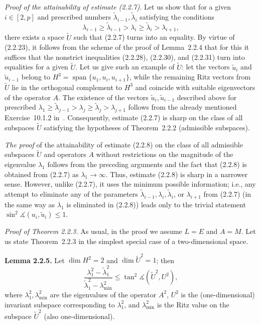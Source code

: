 \documentclass[11pt,oneside]{book}
\newcommand{\myspan}{\operatorname{span}}
\newcommand{\ang}{\measuredangle}
\begin{document}
\textit{Proof of the attainability of estimate (2.2.7).} Let us show that for a given $i \in [2, p]$ and prescribed numbers $\tilde{\lambda}_{i-1}, \tilde{\lambda}_i$ satisfying the conditions
\[
\lambda_{i-1} \geqslant \tilde{\lambda}_{i-1} > \lambda_i \geqslant \tilde{\lambda}_i > \lambda_{i+1},
\]
there exists a space $\widetilde{U}$ such that (2.2.7) turns into an equality. By virtue of (2.2.23), it follows from the scheme of the proof of Lemma~2.2.4 that for this it suffices that the nonstrict inequalities (2.2.28), (2.2.30), and (2.2.31) turn into equalities for a given $\widetilde{U}$. Let us give such an example of $\widetilde{U}$: let the vectors $\tilde{u}_i$ and $\tilde{u}_{i-1}$ belong to $H^3 = \myspan\{u_1, u_i, u_{i+1}\}$, while the remaining Ritz vectors from $\widetilde{U}$ lie in the orthogonal complement to $H^3$ and coincide with suitable eigenvectors of the operator $A$. The existence of the vectors
$\tilde{u}_i, \tilde{u}_{i-1}$ described above for prescribed $\lambda_1 \geqslant \tilde{\lambda}_{j-1} > \lambda_j \geqslant \tilde{\lambda}_j > \lambda_{j+1}$ follows %
from the already mentioned Exercise~10.1.2 in~\citep{Parlett1983}. Consequently, estimate (2.2.7) is sharp on the class of all subspaces $\widetilde{U}$ satisfying the hypotheses of Theorem~2.2.2 (admissible subspaces).

\textit{The proof} of the attainability of estimate (2.2.8) on the class of all admissible subspaces $\widetilde{U}$ and operators $A$ without restrictions on the magnitude of the eigenvalue $\lambda_1$ follows from the preceding arguments and the fact that (2.2.8) is obtained from (2.2.7) as $\lambda_1 \to \infty$. Thus, estimate (2.2.8) is sharp in a narrower sense. However, unlike (2.2.7), it uses the minimum possible information; i.e., any attempt to eliminate any of the parameters $\tilde{\lambda}_{i-1}, \lambda_i, \tilde{\lambda}_i$, or $\lambda_{i+1}$ from (2.2.7) (in the same way as $\lambda_1$ is eliminated in (2.2.8)) leads only to the trivial statement $\sin^2 \ang(u_i, \tilde{u}_i) \leqslant 1$.

\textit{Proof of Theorem 2.2.3.} As usual, in the proof we assume $L = E$ and $A = M$. Let us state Theorem~2.2.3 in the simplest special case of a two-dimensional space.

\textbf{Lemma 2.2.5.} Let $\dim H^2 = 2$ and $\dim \widetilde{U}^2 = 1$; then
\[
\frac{\lambda_1^2 - \tilde{\lambda}_1^2}{\tilde{\lambda}_1^2 - \lambda_{\min}^2} \leqslant \tan^2 \ang(\widetilde{U}^2, U^2), \tag{2.2.35}
\]
where $\lambda_1^2, \lambda_{\min}^2$ are the eigenvalues of the operator $A^2$, $U^2$ is the (one-dimensional) invariant subspace corresponding to $\lambda_1^2$, and $\lambda_{\min}^2$ is the %
Ritz value on the subspace $\widetilde{U}^2$ (also one-dimensional).
\end{document}
